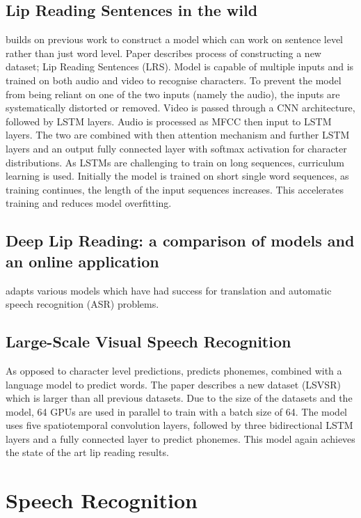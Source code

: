 \documentclass[12pt]{article}
\begin{document}
\subsection{Lip Reading Sentences in the wild}
\cite{Chung2017} builds on previous work to construct a model which can work on sentence level rather than just word level.
Paper describes process of constructing a new dataset; Lip Reading Sentences (LRS).
Model is capable of multiple inputs and is trained on both audio and video to recognise characters.
To prevent the model from being reliant on one of the two inputs (namely the audio), the inputs are systematically distorted or removed.
Video is passed through a CNN architecture, followed by LSTM layers.
Audio is processed as MFCC then input to LSTM layers.
The two are combined with then attention mechanism and further LSTM layers and an output fully connected layer with softmax activation for character distributions.
As LSTMs are challenging to train on long sequences, curriculum learning is used.
Initially the model is trained on short single word sequences, as training continues, the length of the input sequences increases.
This accelerates training and reduces model overfitting.

\subsection{Deep Lip Reading: a comparison of models and an online application}
\cite{Afouras2018} adapts various models which have had success for translation and automatic speech recognition (ASR) problems.

\subsection{Large-Scale Visual Speech Recognition}
As opposed to character level predictions, \cite{Shillingford2018} predicts phonemes, combined with a language model to predict words.
The paper describes a new dataset (LSVSR) which is larger than all previous datasets.
Due to the size of the datasets and the model, 64 GPUs are used in parallel to train with a batch size of 64.
The model uses five spatiotemporal convolution layers, followed by three bidirectional LSTM layers and a fully connected layer to predict phonemes.
This model again achieves the state of the art lip reading results.


\section{Speech Recognition}
\end{document}
